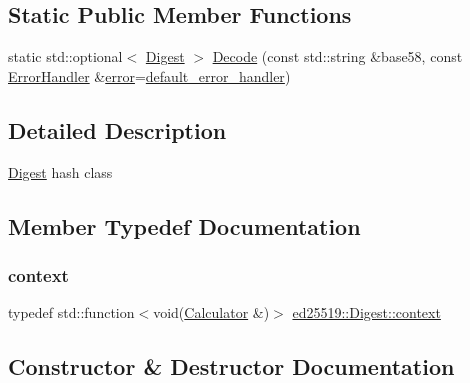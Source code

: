 \subsection*{Static Public Member Functions}
\begin{DoxyCompactItemize}
\item 
static std\+::optional$<$ \mbox{\hyperlink{classed25519_1_1_digest}{Digest}} $>$ \mbox{\hyperlink{classed25519_1_1_digest_a3e74ff17e4b4540bdca27cf1914a4641}{Decode}} (const std\+::string \&base58, const \mbox{\hyperlink{namespaceed25519_a6ba572942b3c18591fc869d52a6b16e6}{Error\+Handler}} \&\mbox{\hyperlink{namespaceed25519_ac93d0b5156eaca22197055e902920bc4}{error}}=\mbox{\hyperlink{namespaceed25519_a7c7bb6ed17541162959c33ed3e3b15fb}{default\+\_\+error\+\_\+handler}})
\end{DoxyCompactItemize}


\subsection{Detailed Description}
\mbox{\hyperlink{classed25519_1_1_digest}{Digest}} hash class 

\subsection{Member Typedef Documentation}
\mbox{\label{classed25519_1_1_digest_ae086cdedc0e704dd1d869138648b2d1a}} 
\subsubsection{\texorpdfstring{context}{context}}
{\footnotesize\ttfamily typedef std\+::function$<$void(\mbox{\hyperlink{structed25519_1_1_digest_1_1_calculator}{Calculator}} \&)$>$ \mbox{\hyperlink{classed25519_1_1_digest_ae086cdedc0e704dd1d869138648b2d1a}{ed25519\+::\+Digest\+::context}}}



\subsection{Constructor \& Destructor Documentation}
\mbox{\label{classed25519_1_1_digest_a18beea9fca7dd58df55300dd5e53420d}} 
